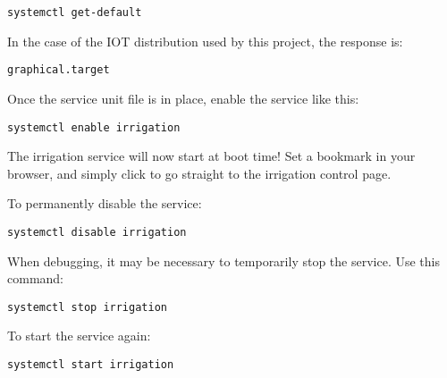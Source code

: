 \begin{verbatim}
systemctl get-default
\end{verbatim}

In the case of the IOT distribution used by this project, the response is:

\begin{verbatim}
graphical.target
\end{verbatim}

Once the service unit file is in place, enable the service like this:

\begin{verbatim}
systemctl enable irrigation
\end{verbatim}

The irrigation service will now start at boot time!  Set a bookmark in your 
browser, and simply click to go straight to the irrigation control page.

To permanently disable the service:

\begin{verbatim}
systemctl disable irrigation
\end{verbatim}

When debugging, it may be necessary to temporarily stop the service.  Use this 
command:

\begin{verbatim}
systemctl stop irrigation
\end{verbatim}

To start the service again:

\begin{verbatim}
systemctl start irrigation
\end{verbatim}



